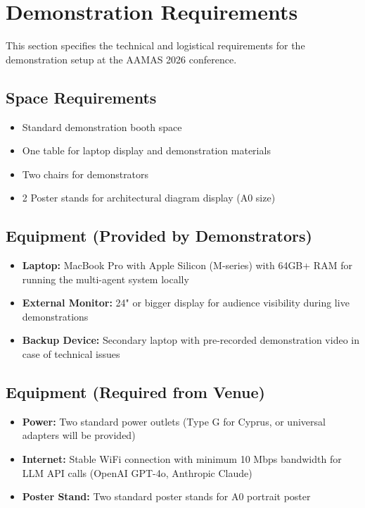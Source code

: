 \documentclass[sigconf]{aamas}
\begin{document}
\iffalse
\clearpage
\section*{Demonstration Requirements}

This section specifies the technical and logistical requirements for the demonstration setup at the AAMAS 2026 conference.

\subsection*{Space Requirements}
\begin{itemize}
    \item Standard demonstration booth space%
    \item One table for laptop display and demonstration materials
    \item Two chairs for demonstrators
    \item 2 Poster stands for architectural diagram display (A0 size)
\end{itemize}

\subsection*{Equipment (Provided by Demonstrators)}
\begin{itemize}
    \item \textbf{Laptop:} MacBook Pro with Apple Silicon (M-series) with 64GB+ RAM for running the multi-agent system locally
    \item \textbf{External Monitor:} 24" or bigger display for audience visibility during live demonstrations
    \item \textbf{Backup Device:} Secondary laptop with pre-recorded demonstration video in case of technical issues
\end{itemize}

\subsection*{Equipment (Required from Venue)}
\begin{itemize}
    \item \textbf{Power:} Two standard power outlets (Type G for Cyprus, or universal adapters will be provided)
    \item \textbf{Internet:} Stable WiFi connection with minimum 10 Mbps bandwidth for LLM API calls (OpenAI GPT-4o, Anthropic Claude)
    \item \textbf{Poster Stand:} Two standard poster stands for A0 portrait poster
\end{itemize}
\end{document}
